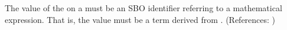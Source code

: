 The value of the   on a \Trigger must be an SBO
identifier referring to a mathematical expression.  That is, the value
must be a term derived from \sbomathformula.  (References: 
)
